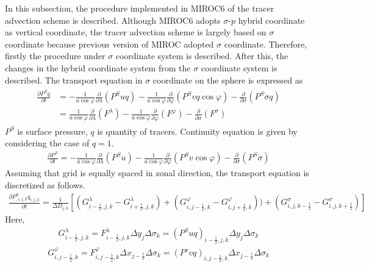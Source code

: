 In this subsection, the procedure implemented in MIROC6 of the tracer advection scheme is described. Although MIROC6 adopts \(\sigma\)-\(p\) hybrid coordinate as vertical coordinate, the tracer
advection scheme is largely based on \(\sigma\) coordinate because previous version of MIROC adopted \(\sigma\) coordinate. Therefore, firstly the procedure under \(\sigma\) coordinate system is
described. After this, the changes in the hybrid coordinate system from the \(\sigma\) coordinate system is described. The transport equation in \(\sigma\) coordinate on the sphere is expressed as \begin{eqnarray}
\begin{aligned}
  \label{b1}
  \frac{\partial P^{S} q}{\partial t} &= - \frac{1}{a \cos \varphi} \frac{\partial}{\partial \lambda}(P^{S} uq)- \frac{1}{a \cos \varphi} \frac{\partial}{\partial \varphi}(P^{S} vq \cos \varphi)- \frac{\partial}{\partial \sigma} (P^{S} \dot{\sigma} q) \\
  &= \frac{1}{a \cos \varphi} \frac{\partial}{\partial \lambda}(F^{\lambda})- \frac{1}{a \cos \varphi} \frac{\partial}{\partial \varphi}(F^{\varphi})- \frac{\partial}{\partial \sigma} (F^{\sigma})\end{aligned}\end{eqnarray}
\(P^{S}\) is surface pressure, \(q\) is quantity of tracers. Continuity equation is given by considering the case of \(q=1\).
\begin{eqnarray}\frac{\partial P^{S}}{\partial t} = - \frac{1}{a \cos \varphi} \frac{\partial}{\partial \lambda}(P^{S}u)- \frac{1}{a \cos \varphi} \frac{\partial}{\partial \varphi}(P^{S}v \cos \varphi)- \frac{\partial}{\partial \sigma} (P^{S} \dot{\sigma})\end{eqnarray}
Assuming that grid is equally spaced in zonal direction, the transport equation is discretized as follows. \begin{eqnarray}\label{a1}
  \frac{\partial P^{S}_{,i,j,k} q_{i,j,k}}{\partial t}=\frac{1}{\Delta D_{j,k}}[(G^{\lambda}_{i-\frac{1}{2},j,k}-G^{\lambda}_{i+\frac{1}{2},j,k})+(G^{\varphi}_{i,j-\frac{1}{2},k}-G^{\varphi}_{i,j+\frac{1}{2},k}))+(G^{\sigma}_{i,j,k-\frac{1}{2}}-G^{\sigma}_{i,j,k+\frac{1}{2}})]\end{eqnarray}
Here, \begin{eqnarray}G^{\lambda}_{i-\frac{1}{2},j,k}=F^{\lambda}_{i-\frac{1}{2},j,k} \Delta y_{j} \Delta \sigma_{k}=(P^{S}uq)_{i-\frac{1}{2},j,k} \Delta y_{j} \Delta \sigma_{k}\end{eqnarray}
\begin{eqnarray}G^{\varphi}_{i,j-\frac{1}{2},k}=F^{\varphi}_{i,j-\frac{1}{2},k} \Delta x_{j-\frac{1}{2}} \Delta \sigma_{k}=(P^{s}vq)_{i,j-\frac{1}{2},k} \Delta x_{j-\frac{1}{2}} \Delta \sigma_{k}\end{eqnarray}
